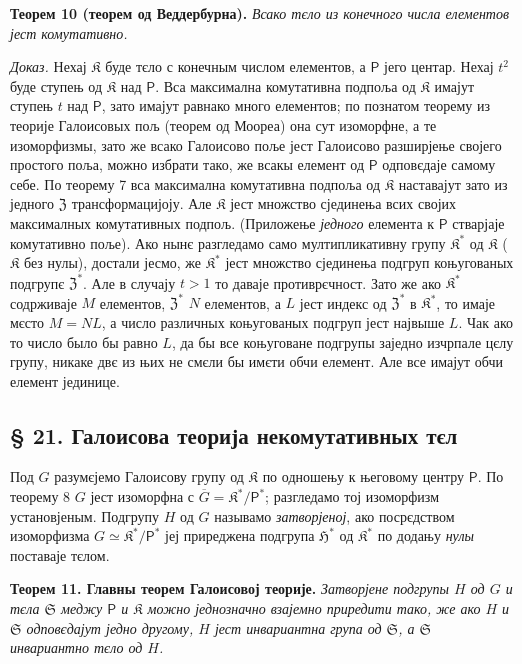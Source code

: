 \documentclass[11pt]{article}
\begin{document}
\textbf{Теорем 10 (теорем од Веддербурна).} \emph{Всако тєло из конечного числа елементов јест комутативно.}

\emph{Доказ.} Нехај \(\mathfrak K\) буде тєло с конечным числом елементов, а \(\mathsf P\) јего центар. Нехај \(t^2\) буде ступењ од \(\mathfrak K\) над \(\mathsf P\). Вса максимална комутативна подпоља од \(\mathfrak K\) имајут ступењ \(t\) над \(\mathsf P\), зато имајут равнако много елементов; по познатом теорему из теорије Галоисовых пољ (теорем од Моореа) она сут изоморфне, а те изоморфизмы, зато же всако Галоисово поље јест Галоисово разширјење својего простого поља, можно избрати тако, же всакы елемент од \(\mathsf P\) одповєдаје самому себе. По теорему 7 вса максимална комутативна подпоља од \(\mathfrak K\) наставајут зато из једного \(\mathfrak Z\) трансформацијоју. Але \(\mathfrak K\) јест множство сјединења всих својих максималных комутативных подпољ. (Приложење \emph{једного} елемента к \(\mathsf P\) стварјаје комутативно поље). Ако нынє разгледамо само мултипликативну групу \(\mathfrak K^*\) од \(\mathfrak K\) (\(\mathfrak K\) без нулы), достали јесмо, же \(\mathfrak K^*\) јест множство сјединења подгруп коњугованых подгрупє \(\mathfrak Z^*\). Але в случају \(t>1\) то даваје противрєчност. Зато же ако \(\mathfrak K^*\) содрживаје \(M\) елементов, \(\mathfrak Z^*\) \(N\) елементов, а \(L\) јест индекс од \(\mathfrak Z^*\) в \(\mathfrak K^*\), то имаје мєсто \(M=NL\), а число различных коњугованых подгруп јест највыше \(L\). Чак ако то число было бы равно \(L\), да бы все коњуговане подгрупы заједно изчрпале цєлу групу, никаке двє из њих не смєли бы имєти обчи елемент. Але все имајут обчи елемент јединице.

\subsection*{§ 21. Галоисова теорија некомутативных тєл}\label{die-galoissche-theorie-der-nichtkommutativen-koerper}

Под \(G\) разумєјемо Галоисову групу од \(\mathfrak K\) по одношењу к његовому центру \(\mathsf P\). По теорему 8 \(G\) јест изоморфна с \(\overline G=\mathfrak K^*/\mathsf P^*\); разгледамо тој изоморфизм установјеным. Подгрупу \(H\) од \(G\) называмо \emph{затворјеној}, ако посрєдством изоморфизма \(G\simeq\mathfrak K^*/\mathsf P^*\) јеј приреджена подгрупа \(\mathfrak H^*\) од \(\mathfrak K^*\) по додању \emph{нулы} поставаје тєлом.


\textbf{Теорем 11. Главны теорем Галоисовој теорије.} \emph{Затворјене подгрупы \(H\) од \(G\) и тєла \(\mathfrak S\) меджу \(\mathsf P\) и \(\mathfrak K\) можно једнозначно взајемно приредити тако, же ако \(H\) и \(\mathfrak S\) одповєдајут једно другому, \(H\) јест инвариантна група од \(\mathfrak S\), а \(\mathfrak S\) инвариантно тєло од \(H\).}
\end{document}
